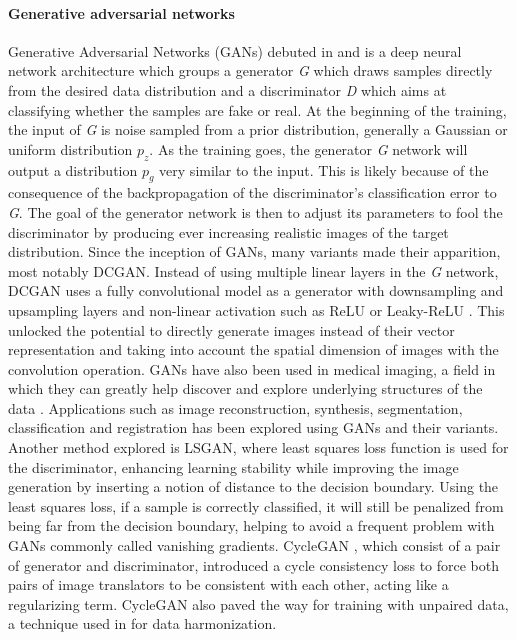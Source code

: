 \documentclass[preprint,12pt]{elsarticle}
\begin{document}
\paragraph{Generative adversarial networks}
Generative Adversarial Networks (GANs) debuted in \cite{Goodfellow2014} and is a deep neural network architecture which groups a generator \emph{G} which draws samples directly from the desired data distribution and a discriminator \emph{D} which aims at classifying whether the samples are fake or real. At the beginning of the training, the input of \emph{G} is noise sampled from a prior distribution, generally a Gaussian or uniform distribution $p_z$. As the training goes, the generator \emph{G} network will output a distribution $p_g$ very similar to the input. This is likely because of the consequence of the backpropagation of the discriminator's classification error to \emph{G}. The goal of the generator network is then to adjust its parameters to fool the discriminator by producing ever increasing realistic images of the target distribution. Since the inception of GANs, many variants made their apparition, most notably DCGAN. Instead of using multiple linear layers in the \emph{G} network, DCGAN uses a fully convolutional model as a generator with downsampling and upsampling layers and non-linear activation such as ReLU or Leaky-ReLU \cite{Maas2013}. This unlocked the potential to directly generate images instead of their vector representation and taking into account the spatial dimension of images with the convolution operation. GANs have also been used in medical imaging, a field in which they can greatly help discover and explore underlying structures of the data \cite{Yi2019}. Applications such as image reconstruction, synthesis, segmentation, classification and registration has been explored using GANs and their variants. Another method explored is LSGAN, where least squares loss function is used for the discriminator, enhancing learning stability while improving the image generation by inserting a notion of distance to the decision boundary. Using the least squares loss, if a sample is correctly classified, it will still be penalized from being far from the decision boundary, helping to avoid a frequent problem with GANs commonly called vanishing gradients. CycleGAN \cite{CycleGAN2017}, which consist of a pair of generator and discriminator, introduced a cycle consistency loss to force both pairs of image translators to be consistent with each other, acting like a regularizing term. CycleGAN also paved the way for training with unpaired data, a technique used in \cite{modanwal2020mri} for data harmonization.
\end{document}
